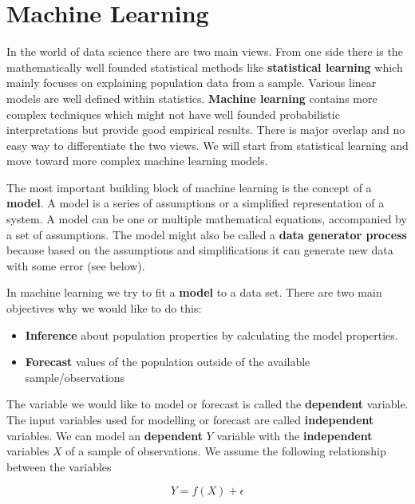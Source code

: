 \chapter{Machine Learning}

In the world of data science there are two main views. From one side there is the mathematically well founded statistical methods like \textbf{statistical learning} which mainly focuses on explaining population data from a sample. Various linear models are well defined within statistics. \textbf{Machine learning} contains more complex techniques which might not have well founded probabilistic interpretations but provide good empirical results. There is major overlap and no easy way to differentiate the two views. We will start from statistical learning and move toward more complex machine learning models.

The most important building block of machine learning is the concept of a \textbf{model}. A model is a series of assumptions or a simplified representation of a system. A model can be one or multiple mathematical equations, accompanied by a set of assumptions. The model might also be called a \textbf{data generator process} because based on the assumptions and simplifications it can generate new data with some error (see below).

In machine learning we try to fit a \textbf{model} to a data set. There are two main objectives why we would like to do this:

\begin{itemize}
    \item \textbf{Inference} about population properties by calculating the model properties.
    \item \textbf{Forecast} values of the population outside of the available sample/observations
\end{itemize}

The variable we would like to model or forecast is called the \textbf{dependent} variable. The input variables used for modelling or forecast are called \textbf{independent} variables. We can model an \textbf{dependent} \(Y\) variable with the \textbf{independent} variables \(X\) of a sample of observations. We assume the following relationship between the variables

\begin{equation}Y = f(X) + \epsilon \tag{4.1}\end{equation}

